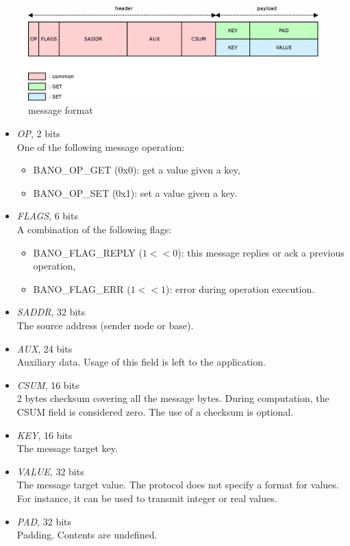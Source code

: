 \documentclass[a4paper, 11pt]{article}
\begin{document}
\paragraph{}
\begin{figure}[!h]
\begin{center}
\includegraphics[scale=0.2]{../dia/msg_format/main.jpeg}
\end{center}
\caption{\tiny{message format}}
\label{msg_format}
\end{figure}

\begin{itemize}
\item \textit{OP}, 2 bits\\
One of the following message operation:
\begin{itemize}
\item BANO\_OP\_GET (0x0): get a value given a key,
\item BANO\_OP\_SET (0x1): set a value given a key.
\end{itemize}
\item \textit{FLAGS}, 6 bits\\
A combination of the following flags:
\begin{itemize}
\item BANO\_FLAG\_REPLY ($1<<0$): this message replies or ack a
previous operation,
\item BANO\_FLAG\_ERR ($1<<1$): error during operation execution.
\end{itemize}
\item \textit{SADDR}, 32 bits\\
The source address (sender node or base).
\item \textit{AUX}, 24 bits\\
Auxiliary data. Usage of this field is left to the application.
\item \textit{CSUM}, 16 bits\\
2 bytes checksum covering all the message bytes. During computation,
the CSUM field is considered zero. The use of a checksum is optional.
\item \textit{KEY}, 16 bits\\
The message target key.
\item \textit{VALUE}, 32 bits\\
The message target value. The protocol does not specify a format for
values. For instance, it can be used to transmit integer or real values.
\item \textit{PAD}, 32 bits\\
Padding. Contents are undefined.
\end{itemize}
\end{document}

